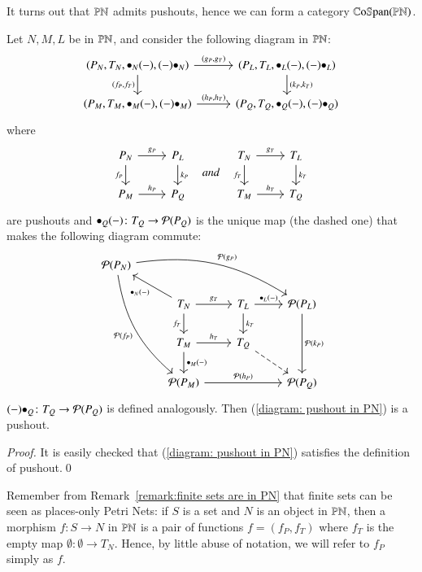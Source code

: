 It turns out that $\mathbb{PN}$ admits pushouts, hence we can form a category $\mathbb{C}\mathrm{o}\mathbb{S}\mathrm{pan}(\mathbb{PN})$.

\begin{proposition}\label{prop: pushouts in PN}
    Let $N,M,L$ be in $\mathbb{PN}$, and consider the following diagram in $\mathbb{PN}$:
    \begin{equation}\label{diagram: pushout in PN}
    \begin{tikzcd}[column sep=3em]
    (P_N,T_N,\Inp {N} ,\Out {N} ) \ar[r,"{(g_P,g_T)}"] \ar[d,"{(f_P,f_T)}"'] & (P_L,T_L,\Inp L,\Out L ) \ar[d,"{(k_P,k_T)}"] \\
    (P_M,T_M,\Inp M,\Out M) \ar[r,"{(h_P,h_T)}"] & (P_Q,T_Q,\Inp Q,\Out Q)
    \end{tikzcd}
    \end{equation}
    where
    \[
    \begin{tikzcd}
    P_N \ar[r,"g_P"] \ar[d,"f_P"'] & P_L \ar[d,"k_P"] \\
    P_M \ar[r,"h_P"] & P_Q
    \end{tikzcd}
    \quad {and} \quad
    \begin{tikzcd}
    T_N \ar[r,"g_T"] \ar[d,"f_T"'] & T_L \ar[d,"k_T"] \\
    T_M \ar[r,"h_T"] & T_Q
    \end{tikzcd}
    \]
    are pushouts and $\bullet_{Q} (-) \colon T_Q \to \mathcal{P}(P_Q)$ is the unique map (the dashed one) that makes the following diagram commute:
    \[
    \begin{tikzcd}
    \parts{P_N} \ar[dddr,bend angle=20,bend right,"\parts{f_P}"'] \ar[rrrd,bend angle=20,bend left,"\parts{g_P}"] \\
    & T_N \ar[r,"g_T"] \ar[d,"f_T"'] \ar[ul,"\Inp N"] & T_L \ar[d,"k_T"] \ar[r,"\Inp L"] & \parts{P_L} \ar[dd,"\parts{k_P}"] \\
    & T_M \ar[r,"h_T"] \ar[d,"\Inp M"] & T_Q \ar[dr,dashed] \\
    & \parts{P_M} \ar[rr,"\parts{h_P}"] & & \parts{P_Q}
    \end{tikzcd}
    \]
    $(-) \bullet_{Q} \colon T_Q \to \mathcal{P}(P_Q)$ is defined analogously. Then (\ref{diagram: pushout in PN}) is a pushout.
\end{proposition}
\begin{proof}
    It is easily checked that (\ref{diagram: pushout in PN}) satisfies the definition of pushout.\qed
\end{proof}

Remember from Remark~\ref{remark:finite sets are in PN} that finite sets can be seen as places-only Petri Nets: if $S$ is a set and $N$ is an object in $\mathbb{PN}$, then a morphism $f \colon S \to N$ in $\mathbb{PN}$ is a pair of functions $f=(f_P,f_T)$ where $f_T$ is the empty map $\emptyset \colon \emptyset \to T_N$. Hence, by little abuse of notation, we will refer to $f_P$ simply as $f$. 

